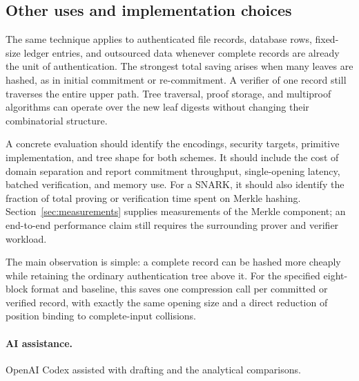 \documentclass[11pt,letterpaper]{article}
\theoremstyle{definition} %
\begin{document}
\subsection{Other uses and implementation choices}
The same technique applies to authenticated file records, database rows,
fixed-size ledger entries, and outsourced data whenever complete records
are already the unit of authentication. The strongest total saving arises
when many leaves are hashed, as in initial commitment or re-commitment.
A verifier of one record still traverses the entire upper path. Tree
traversal, proof storage, and multiproof algorithms can operate over the
new leaf digests without changing their combinatorial structure.

A concrete evaluation should identify the encodings, security targets,
primitive implementation, and tree shape for both schemes. It should
include the cost of domain separation and report commitment throughput,
single-opening latency, batched verification, and memory use. For a SNARK,
it should also identify the fraction of total proving or verification time
spent on Merkle hashing. Section~\ref{sec:measurements} supplies measurements
of the Merkle component; an end-to-end performance claim still requires
the surrounding prover and verifier workload.

The main observation is simple: a complete record can be hashed more
cheaply while retaining the ordinary authentication tree above it. For the
specified eight-block format and baseline, this saves one compression call
per committed or verified record, with exactly the same opening size and
a direct reduction of position binding to complete-input collisions.

\paragraph{AI assistance.}
OpenAI Codex assisted with drafting and the analytical comparisons.
\end{document}
